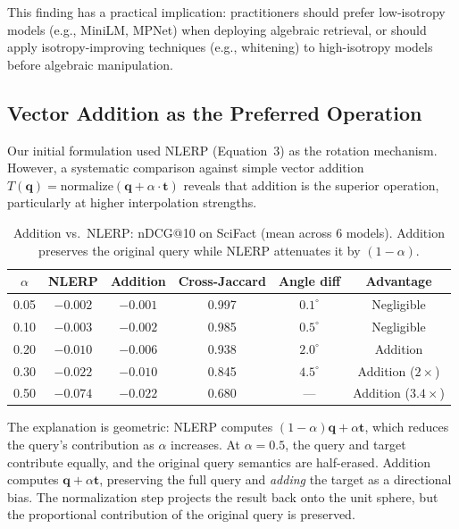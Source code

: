 \documentclass{article}
\begin{document}
This finding has a practical implication: practitioners should prefer low-isotropy models (e.g., MiniLM, MPNet) when deploying algebraic retrieval, or should apply isotropy-improving techniques (e.g., whitening) to high-isotropy models before algebraic manipulation.

\subsection{Vector Addition as the Preferred Operation}
\label{sec:addition}

Our initial formulation used NLERP (Equation~3) as the rotation mechanism. However, a systematic comparison against simple vector addition $T(\mathbf{q}) = \text{normalize}(\mathbf{q} + \alpha \cdot \mathbf{t})$ reveals that addition is the superior operation, particularly at higher interpolation strengths.

\begin{table}[ht]
\centering
\caption{Addition vs.\ NLERP: nDCG@10 on SciFact (mean across 6 models). Addition preserves the original query while NLERP attenuates it by $(1-\alpha)$.}
\label{tab:addition}
\small
\begin{tabular}{cccccc}
\toprule
$\alpha$ & NLERP & Addition & Cross-Jaccard & Angle diff & Advantage \\
\midrule
0.05 & $-0.002$ & $-0.001$ & 0.997 & $0.1^{\circ}$ & Negligible \\
0.10 & $-0.003$ & $-0.002$ & 0.985 & $0.5^{\circ}$ & Negligible \\
0.20 & $-0.010$ & $-0.006$ & 0.938 & $2.0^{\circ}$ & Addition \\
0.30 & $-0.022$ & $-0.010$ & 0.845 & $4.5^{\circ}$ & Addition ($2\times$) \\
0.50 & $-0.074$ & $-0.022$ & 0.680 & --- & Addition ($3.4\times$) \\
\bottomrule
\end{tabular}
\end{table}

The explanation is geometric: NLERP computes $(1-\alpha)\mathbf{q} + \alpha\mathbf{t}$, which reduces the query's contribution as $\alpha$ increases. At $\alpha = 0.5$, the query and target contribute equally, and the original query semantics are half-erased. Addition computes $\mathbf{q} + \alpha \mathbf{t}$, preserving the full query and \emph{adding} the target as a directional bias. The normalization step projects the result back onto the unit sphere, but the proportional contribution of the original query is preserved.
\end{document}
